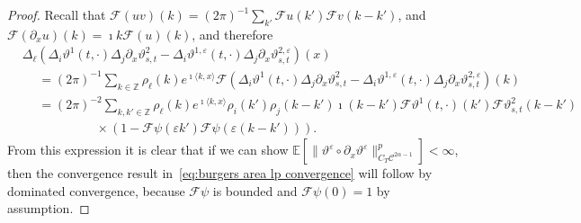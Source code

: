 \documentclass[a4paper,11pt]{article}
\theoremstyle{remark}
\newcommand{\Z}{\mathbb{Z}}
\newcommand{\E}{\mathbb{E}}
\newcommand{\CC}{\ensuremath{\mathscr{C}}}
\newcommand{\CF}{\ensuremath{\mathscr{F}}}
\newcommand{\reso}{\,\mathord{\circ}\,}
\begin{document}
\begin{proof}
   Recall that $\CF(u v)(k) = (2\pi)^{-1} \sum_{k'} \CF u(k') \CF v(k -k')$, and $\CF(\partial_x u)(k) = \imath k \CF(u)(k)$, and therefore 
   \begin{align*}
      &\Delta_{\ell} (\Delta_i \vartheta^1(t,\cdot) \Delta_j \partial_x \vartheta^2_{s,t} - \Delta_i \vartheta^{1,\varepsilon} (t,\cdot) \Delta_j \partial_x \vartheta^{2,\varepsilon}_{s,t})(x) \\
      &\hspace{15pt} = (2\pi)^{-1} \sum_{k \in \Z} \rho_\ell(k) e^{\imath \langle k, x \rangle} \CF(\Delta_i \vartheta^1(t,\cdot) \Delta_j \partial_x \vartheta^2_{s,t} - \Delta_i \vartheta^{1,\varepsilon} (t,\cdot) \Delta_j \partial_x \vartheta^{2,\varepsilon}_{s,t})(k) \\
      &\hspace{15pt} = (2\pi)^{-2} \sum_{k,k' \in \Z} \rho_\ell(k) e^{\imath \langle k, x \rangle} \rho_i(k') \rho_j(k-k') \imath (k-k') \CF \vartheta^1(t,\cdot)(k') \CF\vartheta^2_{s,t}(k-k') \\
      &\hspace{70pt} \times (1 - \CF \psi(\varepsilon k') \CF \psi(\varepsilon(k-k'))).
   \end{align*}
   From this expression it is clear that if we can show $\E[\| \vartheta^\varepsilon \reso \partial_x \vartheta^\varepsilon \|_{C_T \CC^{2\alpha - 1}}^p] < \infty$, then the convergence result in~\eqref{eq:burgers area lp convergence} will follow by dominated convergence, because $\CF \psi$ is bounded and $\CF \psi(0) = 1$ by assumption.
   

\end{proof}
\end{document}
